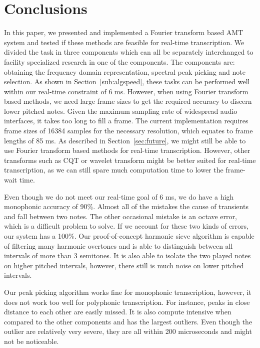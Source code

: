 \documentclass[10pt,twocolumn]{article}
\begin{document}
\section{Conclusions}
In this paper, we presented and implemented a Fourier transform based AMT system and tested if these methods are feasible for real-time transcription. We divided the task in three components which can all be separately interchanged to facility specialized research in one of the components. The components are: obtaining the frequency domain representation, spectral peak picking and note selection. As shown in Section~\ref{sub:algspeed}, these tasks can be performed well within our real-time constraint of 6 ms. However, when using Fourier transform based methods, we need large frame sizes to get the required accuracy to discern lower pitched notes. Given the maximum sampling rate of widespread audio interfaces, it takes too long to fill a frame. The current implementation requires frame sizes of 16384 samples for the necessary resolution, which equates to frame lengths of 85 ms. As described in Section~\ref{sec:future}, we might still be able to use Fourier transform based methods for real-time transcription. However, other transforms such as CQT or wavelet transform might be better suited for real-time transcription, as we can still spare much computation time to lower the frame-wait time.

Even though we do not meet our real-time goal of 6 ms, we do have a high monophonic accuracy of 90\%. Almost all of the mistakes the cause of transients and fall between two notes. The other occasional mistake is an octave error, which is a difficult problem to solve. If we account for these two kinds of errors, our system has a 100\%. Our proof-of-concept harmonic sieve algorithm is capable of filtering many harmonic overtones and is able to distinguish between all intervals of more than 3 semitones. It is also able to isolate the two played notes on higher pitched intervals, however, there still is much noise on lower pitched intervals.

Our peak picking algorithm works fine for monophonic transcription, however, it does not work too well for polyphonic transcription. For instance, peaks in close distance to each other are easily missed. It is also compute intensive when compared to the other components and has the largest outliers. Even though the outlier are relatively very severe, they are all within 200 microseconds and might not be noticeable.
\end{document}
